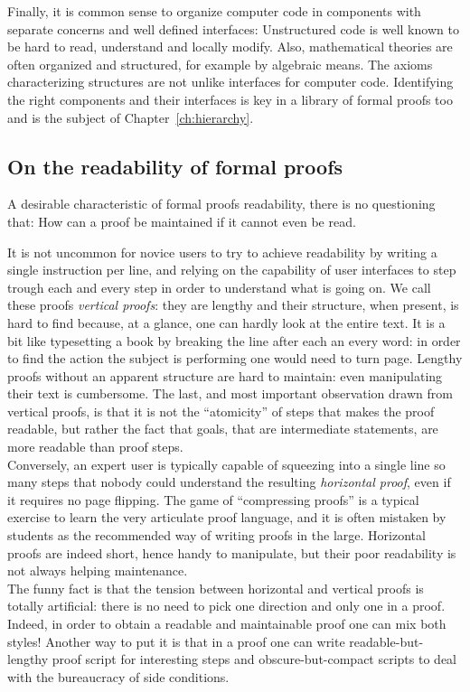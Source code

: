 Finally, it is common sense to organize computer code
in components with separate concerns and well defined interfaces:
Unstructured code is  well known to be hard to read, understand and
locally modify.
Also, mathematical theories are often organized and structured, for
example by algebraic means. The axioms characterizing structures
are not unlike interfaces for computer code.
Identifying the right components and their interfaces is key in a library of
formal proofs too and is the subject of Chapter~\ref{ch:hierarchy}.

\subsection{On the readability of formal proofs}

A desirable characteristic of formal proofs  readability,
there is no questioning that: How can a proof be maintained if
it cannot even be read.

It is not uncommon for novice users to try to achieve readability by
writing a single instruction per line, and relying on the capability
of user interfaces to step trough each and every step in order to
understand what is going on. We call these proofs \emph{vertical proofs}:
they are lengthy
and their structure, when present, is hard to find
because, at a glance, one can hardly look at the entire text.
It is a bit like
typesetting a book by breaking the line after each an every word: in
order to find the action the subject is performing one would need to
turn page.  
Lengthy proofs without an apparent structure are hard to
maintain: even manipulating their text is cumbersome. The last, and
most important observation drawn from vertical proofs, is that it is
not the ``atomicity'' of steps that makes the proof readable, but
rather the fact that goals, that are intermediate statements, are
more readable than proof steps. \\
Conversely, an expert \mcbSSR{} user is typically capable of squeezing
into a single line so many steps that nobody could understand the
resulting \emph{horizontal proof}, even if it requires no page flipping.
The game of ``compressing proofs''
is a typical exercise to learn the very articulate \mcbSSR{} proof
language, and it is often
mistaken by students as the recommended way of writing proofs in the
large. Horizontal proofs are indeed short, hence handy to
manipulate, but their poor readability is not always helping maintenance.\\
The funny fact is that the tension between horizontal and vertical
proofs is totally artificial: there is no need to pick one direction and only
one in a proof. Indeed, in order to obtain a readable and maintainable proof
one can mix both styles! Another way to put it is that in a proof one
can write readable-but-lengthy proof script for interesting steps
and obscure-but-compact scripts to deal with the bureaucracy of side conditions.

